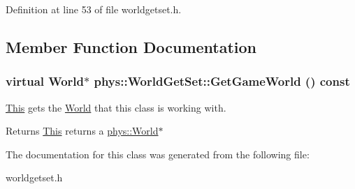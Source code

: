 Definition at line 53 of file worldgetset.h.



\subsection{Member Function Documentation}
\hypertarget{classphys_1_1WorldGetSet_ae11f48a9152834423647ea44e7fd7ee5}{
\subsubsection[{GetGameWorld}]{\setlength{\rightskip}{0pt plus 5cm}virtual {\bf World}$\ast$ phys::WorldGetSet::GetGameWorld () const}}
\label{dc/d4f/classphys_1_1WorldGetSet_ae11f48a9152834423647ea44e7fd7ee5}


\hyperlink{structThis}{This} gets the \hyperlink{classphys_1_1World}{World} that this class is working with. 

\begin{DoxyReturn}{Returns}
\hyperlink{structThis}{This} returns a \hyperlink{classphys_1_1World}{phys::World}$\ast$ 
\end{DoxyReturn}


The documentation for this class was generated from the following file:\begin{DoxyCompactItemize}
\item 
worldgetset.h\end{DoxyCompactItemize}
